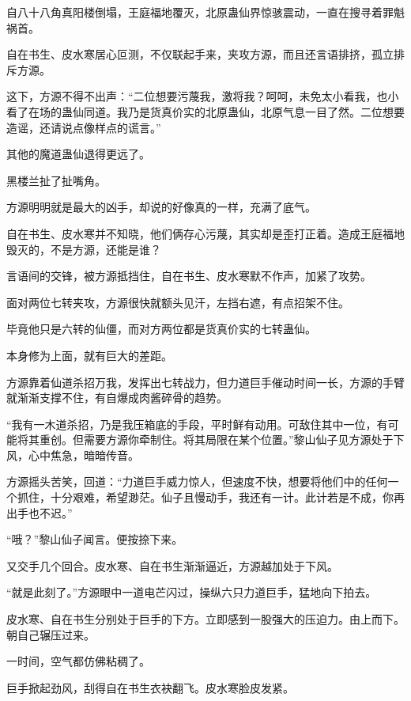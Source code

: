 
\begin{this_body}

自八十八角真阳楼倒塌，王庭福地覆灭，北原蛊仙界惊骇震动，一直在搜寻着罪魁祸首。

自在书生、皮水寒居心叵测，不仅联起手来，夹攻方源，而且还言语排挤，孤立排斥方源。

这下，方源不得不出声：“二位想要污蔑我，激将我？呵呵，未免太小看我，也小看了在场的蛊仙同道。我乃是货真价实的北原蛊仙，北原气息一目了然。二位想要造谣，还请说点像样点的谎言。”

其他的魔道蛊仙退得更远了。

黑楼兰扯了扯嘴角。

方源明明就是最大的凶手，却说的好像真的一样，充满了底气。

自在书生、皮水寒并不知晓，他们俩存心污蔑，其实却是歪打正着。造成王庭福地毁灭的，不是方源，还能是谁？

言语间的交锋，被方源抵挡住，自在书生、皮水寒默不作声，加紧了攻势。

面对两位七转夹攻，方源很快就额头见汗，左挡右遮，有点招架不住。

毕竟他只是六转的仙僵，而对方两位都是货真价实的七转蛊仙。

本身修为上面，就有巨大的差距。

方源靠着仙道杀招万我，发挥出七转战力，但力道巨手催动时间一长，方源的手臂就渐渐支撑不住，有自爆成肉酱碎骨的趋势。

“我有一木道杀招，乃是我压箱底的手段，平时鲜有动用。可敌住其中一位，有可能将其重创。但需要方源你牵制住。将其局限在某个位置。”黎山仙子见方源处于下风，心中焦急，暗暗传音。

方源摇头苦笑，回道：“力道巨手威力惊人，但速度不快，想要将他们中的任何一个抓住，十分艰难，希望渺茫。仙子且慢动手，我还有一计。此计若是不成，你再出手也不迟。”

“哦？”黎山仙子闻言。便按捺下来。

又交手几个回合。皮水寒、自在书生渐渐逼近，方源越加处于下风。

“就是此刻了。”方源眼中一道电芒闪过，操纵六只力道巨手，猛地向下拍去。

皮水寒、自在书生分别处于巨手的下方。立即感到一股强大的压迫力。由上而下。朝自己辗压过来。

一时间，空气都仿佛粘稠了。

巨手掀起劲风，刮得自在书生衣袂翻飞。皮水寒脸皮发紧。


\end{this_body}
